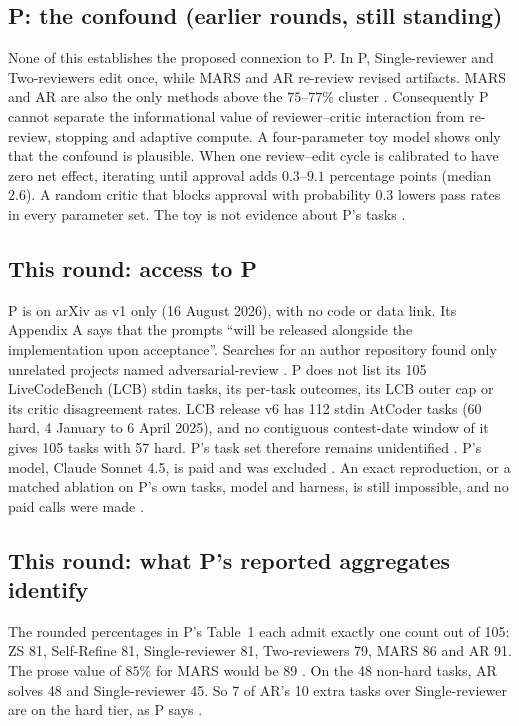 \documentclass{article}
\begin{document}
\subsection{P: the confound (earlier rounds, still standing)}
None of this establishes the proposed connexion to P. In P, Single-reviewer and Two-reviewers edit once, while MARS and AR re-review revised artifacts. MARS and AR are also the only methods above the \(75\)--\(77\%\) cluster . Consequently P cannot separate the informational value of reviewer--critic interaction from re-review, stopping and adaptive compute. A four-parameter toy model shows only that the confound is plausible. When one review--edit cycle is calibrated to have zero net effect, iterating until approval adds \(0.3\)--\(9.1\) percentage points (median \(2.6\)). A random critic that blocks approval with probability \(0.3\) lowers pass rates in every parameter set. The toy is not evidence about P's tasks .

\subsection{This round: access to P}
P is on arXiv as v1 only (16 August 2026), with no code or data link. Its Appendix A says that the prompts ``will be released alongside the implementation upon acceptance''. Searches for an author repository found only unrelated projects named adversarial-review . P does not list its 105 LiveCodeBench (LCB) stdin tasks, its per-task outcomes, its LCB outer cap or its critic disagreement rates. LCB release v6 has 112 stdin AtCoder tasks (60 hard, 4 January to 6 April 2025), and no contiguous contest-date window of it gives 105 tasks with 57 hard. P's task set therefore remains unidentified . P's model, Claude Sonnet 4.5, is paid and was excluded . An exact reproduction, or a matched ablation on P's own tasks, model and harness, is still impossible, and no paid calls were made .

\subsection{This round: what P's reported aggregates identify}
The rounded percentages in P's Table~1 each admit exactly one count out of 105: ZS 81, Self-Refine 81, Single-reviewer 81, Two-reviewers 79, MARS 86 and AR 91. The prose value of \(85\%\) for MARS would be 89 . On the 48 non-hard tasks, AR solves 48 and Single-reviewer 45. So 7 of AR's 10 extra tasks over Single-reviewer are on the hard tier, as P says .
\end{document}
